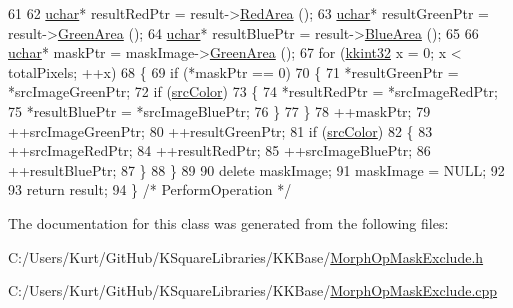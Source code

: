 \begin{DoxyCode}
61 
62   \hyperlink{namespace_k_k_b_ace9969169bf514f9ee6185186949cdf7}{uchar}*  resultRedPtr   = result->\hyperlink{class_k_k_b_1_1_raster_aa3d0f9b4ce0fdd8ac97f996058d09b22}{RedArea} ();
63   \hyperlink{namespace_k_k_b_ace9969169bf514f9ee6185186949cdf7}{uchar}*  resultGreenPtr = result->\hyperlink{class_k_k_b_1_1_raster_af6ceacfa7835a295d239d141627dbec7}{GreenArea} ();
64   \hyperlink{namespace_k_k_b_ace9969169bf514f9ee6185186949cdf7}{uchar}*  resultBluePtr  = result->\hyperlink{class_k_k_b_1_1_raster_ade7c77867e6b3833e96f5f86aefcffec}{BlueArea} ();
65 
66   \hyperlink{namespace_k_k_b_ace9969169bf514f9ee6185186949cdf7}{uchar}*  maskPtr = maskImage->\hyperlink{class_k_k_b_1_1_raster_af6ceacfa7835a295d239d141627dbec7}{GreenArea} ();
67   \textcolor{keywordflow}{for}  (\hyperlink{namespace_k_k_b_a8fa4952cc84fda1de4bec1fbdd8d5b1b}{kkint32} x = 0;  x < totalPixels;  ++x)
68   \{
69     \textcolor{keywordflow}{if}  (*maskPtr == 0)
70     \{
71       *resultGreenPtr = *srcImageGreenPtr;
72       \textcolor{keywordflow}{if}  (\hyperlink{class_k_k_b_1_1_morph_op_a0cecdeb8369c7ab2689fbd9f997472b0}{srcColor})
73       \{
74         *resultRedPtr  = *srcImageRedPtr;
75         *resultBluePtr = *srcImageBluePtr;
76       \}
77     \}
78     ++maskPtr;
79     ++srcImageGreenPtr;
80     ++resultGreenPtr;
81     \textcolor{keywordflow}{if}  (\hyperlink{class_k_k_b_1_1_morph_op_a0cecdeb8369c7ab2689fbd9f997472b0}{srcColor})
82     \{
83       ++srcImageRedPtr;
84       ++resultRedPtr;
85       ++srcImageBluePtr;
86       ++resultBluePtr;
87     \}
88   \}
89 
90   \textcolor{keyword}{delete}  maskImage;
91   maskImage = NULL;
92 
93   \textcolor{keywordflow}{return}  result;
94 \}  \textcolor{comment}{/* PerformOperation */}
\end{DoxyCode}


The documentation for this class was generated from the following files\+:\begin{DoxyCompactItemize}
\item 
C\+:/\+Users/\+Kurt/\+Git\+Hub/\+K\+Square\+Libraries/\+K\+K\+Base/\hyperlink{_morph_op_mask_exclude_8h}{Morph\+Op\+Mask\+Exclude.\+h}\item 
C\+:/\+Users/\+Kurt/\+Git\+Hub/\+K\+Square\+Libraries/\+K\+K\+Base/\hyperlink{_morph_op_mask_exclude_8cpp}{Morph\+Op\+Mask\+Exclude.\+cpp}\end{DoxyCompactItemize}
